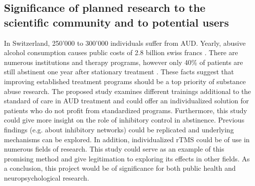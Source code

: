 \documentclass[12pt]{article}
\begin{document}
\subsection{Significance of planned research to the scientific community and to potential users}
In Switzerland, 250’000 to 300’000 individuals suffer from AUD. Yearly, abusive alcohol consumption causes public costs of 2.8 billion swiss francs \parencite{AlkoholUndAlkoholpravention2021}. There are numerous institutions and therapy programs, however only 40\% of patients are still abstinent one year after stationary treatment \parencite{moggiSubstanceUseDisorder2007}. These facts suggest that improving established treatment programs should be a top priority of substance abuse research. The proposed study examines different trainings additional to the standard of care in AUD treatment and could offer an individualized solution for patients who do not profit from standardized programs. 
Furthermore, this study could give more insight on the role of inhibitory control in abstinence. Previous findings (e.g. about inhibitory networks) could be replicated and underlying mechanisms can be explored.
In addition, individualized rTMS could be of use in numerous fields of research. This study could serve as an example of this promising method and give legitimation to exploring its effects in other fields.
As a conclusion, this project would be of significance for both public health and neuropsychological research.



\printbibliography  
\end{document}
